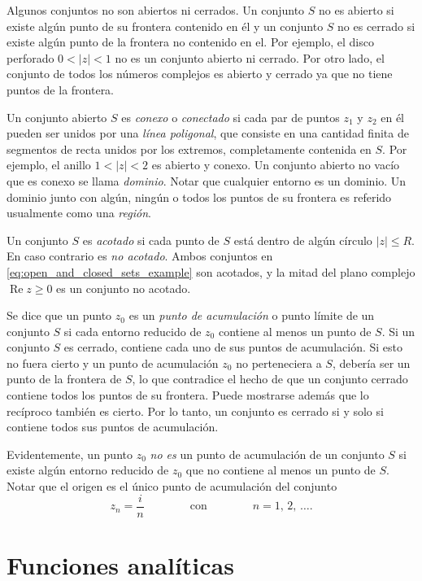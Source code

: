 \documentclass[a4paper]{report}
\renewcommand{\Re}{\operatorname{Re}}
\begin{document}
Algunos conjuntos no son abiertos ni cerrados. Un conjunto \(S\) no es abierto si existe algún punto de su frontera contenido en él y un conjunto \(S\) no es cerrado si existe algún punto de la frontera no contenido en el. Por ejemplo, el disco perforado \(0<|z|<1\) no es un conjunto abierto ni cerrado. Por otro lado, el conjunto de todos los números complejos es abierto y cerrado ya que no tiene puntos de la frontera.  

Un conjunto abierto \(S\) es \emph{conexo} o \emph{conectado} si cada par de puntos \(z_1\) y \(z_2\) en él pueden ser unidos por una \emph{línea poligonal}, que consiste en una cantidad finita de segmentos de recta unidos por los extremos, completamente contenida en \(S\). Por ejemplo, el anillo \(1<|z|<2\) es abierto y conexo. Un conjunto abierto no vacío que es conexo se llama \emph{dominio}. Notar que cualquier entorno es un dominio. Un dominio junto con algún, ningún o todos los puntos de su frontera es referido usualmente como una \emph{región}.

Un conjunto \(S\) es \emph{acotado} si cada punto de \(S\) está dentro de algún círculo \(|z|\leq R\). En caso contrario es \emph{no acotado}. Ambos conjuntos en \ref{eq:open_and_closed_sets_example} son acotados, y la mitad del plano complejo \(\Re z\geq0\) es un conjunto no acotado.

Se dice que un punto \(z_0\) es un \emph{punto de acumulación} o punto límite de un conjunto \(S\) si cada entorno reducido de \(z_0\) contiene al menos un punto de \(S\). Si un conjunto \(S\) es cerrado, contiene cada uno de sus puntos de acumulación. Si esto no fuera cierto y un punto de acumulación \(z_0\) no perteneciera a \(S\), debería ser un punto de la frontera de \(S\), lo que contradice el hecho de que un conjunto cerrado contiene todos los puntos de su frontera. Puede mostrarse además que lo recíproco también es cierto. Por lo tanto, un conjunto es cerrado si y solo si contiene todos sus puntos de acumulación.

Evidentemente, un punto \(z_0\) \emph{no es} un punto de acumulación de un conjunto \(S\) si existe algún entorno reducido de \(z_0\) que no contiene al menos un punto de \(S\). Notar que el origen es el único punto de acumulación del conjunto 
\[
 z_n=\frac{i}{n}
 \qquad\qquad\textrm{con}\qquad\qquad
 n=1,\,2,\,\dots.
\]

\chapter{Funciones analíticas}
\end{document}
